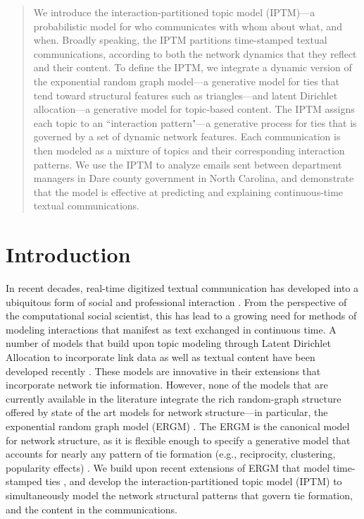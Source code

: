\documentclass{article}
\begin{document}
\printAffiliationsAndNotice{\icmlEqualContribution} %

\begin{abstract}
We introduce the interaction-partitioned topic model
(IPTM)---a probabilistic model for who communicates with whom about
what, and when. Broadly speaking, the IPTM partitions time-stamped
textual communications, according to both the network
dynamics that they reflect and their content. To define the IPTM, we
integrate a dynamic version of the exponential random graph model---a generative model for ties that tend toward structural features such as triangles---and latent Dirichlet allocation---a generative model for topic-based content.
The IPTM assigns each topic to an ``interaction
pattern"---a generative process for ties that is governed by a set of
dynamic network features. Each communication is then modeled as a
mixture of topics and their corresponding interaction patterns. We use
the IPTM to analyze emails sent between department managers in Dare
county government in North Carolina, and demonstrate that the model is effective
at predicting and explaining continuous-time textual communications.
\end{abstract}

\section{Introduction}
\label{Introduction}
In recent decades, real-time digitized textual communication has developed into a ubiquitous form of social and professional interaction \cite[see, e.g.,][]{kanungo2008modeling, szostek2011dealing, burgess2004email, pew2016}. From the perspective of the computational social scientist, this has lead to a growing need for methods of modeling interactions that manifest as text exchanged in continuous time. A number of models that build upon topic modeling through Latent Dirichlet Allocation \cite{Blei2003} to incorporate link data as well as textual content have been developed recently \cite{mccallum2005author,lim2013twitter,Krafft2012}. These models are innovative in their extensions that incorporate network tie information. However, none of the models that are currently available in the literature integrate the rich random-graph structure offered by state of the art models for network structure---in particular, the exponential random graph model (ERGM) \cite{robins2007introduction,chatterjee2013estimating,hunter2008ergm}. The ERGM is the canonical model for network structure, as it is flexible enough to specify a generative model that accounts for nearly any pattern of tie formation (e.g., reciprocity, clustering, popularity effects) \cite{desmarais2017statistical}. We build upon recent extensions of ERGM that model time-stamped ties \cite{PerryWolfe2012,Butts2008}, and develop the interaction-partitioned topic model (IPTM) to simultaneously model the network structural patterns that govern tie formation, and the content in the communications.
\end{document}
